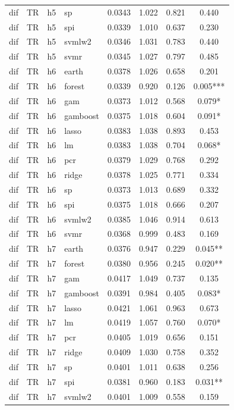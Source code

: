 \begin{ThreePartTable}
\begin{longtable}[t]{llclcccc}
dif & TR & h5 & sp & 0.0343 & 1.022 & 0.821 & 0.440\\
dif & TR & h5 & spi & 0.0339 & 1.010 & 0.637 & 0.230\\
dif & TR & h5 & svmlw2 & 0.0346 & 1.031 & 0.783 & 0.440\\
dif & TR & h5 & svmr & 0.0345 & 1.027 & 0.797 & 0.485\\
\addlinespace
dif & TR & h6 & earth & 0.0378 & 1.026 & 0.658 & 0.201\\
dif & TR & h6 & forest & 0.0339 & 0.920 & 0.126 & 0.005***\\
dif & TR & h6 & gam & 0.0373 & 1.012 & 0.568 & 0.079*\\
dif & TR & h6 & gamboost & 0.0375 & 1.018 & 0.604 & 0.091*\\
dif & TR & h6 & lasso & 0.0383 & 1.038 & 0.893 & 0.453\\
dif & TR & h6 & lm & 0.0383 & 1.038 & 0.704 & 0.068*\\
dif & TR & h6 & pcr & 0.0379 & 1.029 & 0.768 & 0.292\\
dif & TR & h6 & ridge & 0.0378 & 1.025 & 0.771 & 0.334\\
dif & TR & h6 & sp & 0.0373 & 1.013 & 0.689 & 0.332\\
dif & TR & h6 & spi & 0.0375 & 1.018 & 0.666 & 0.207\\
dif & TR & h6 & svmlw2 & 0.0385 & 1.046 & 0.914 & 0.613\\
dif & TR & h6 & svmr & 0.0368 & 0.999 & 0.483 & 0.169\\
\addlinespace
dif & TR & h7 & earth & 0.0376 & 0.947 & 0.229 & 0.045**\\
dif & TR & h7 & forest & 0.0380 & 0.956 & 0.245 & 0.020**\\
dif & TR & h7 & gam & 0.0417 & 1.049 & 0.737 & 0.135\\
dif & TR & h7 & gamboost & 0.0391 & 0.984 & 0.405 & 0.083*\\
dif & TR & h7 & lasso & 0.0421 & 1.061 & 0.963 & 0.673\\
dif & TR & h7 & lm & 0.0419 & 1.057 & 0.760 & 0.070*\\
dif & TR & h7 & pcr & 0.0405 & 1.019 & 0.656 & 0.151\\
dif & TR & h7 & ridge & 0.0409 & 1.030 & 0.758 & 0.352\\
dif & TR & h7 & sp & 0.0401 & 1.011 & 0.638 & 0.256\\
dif & TR & h7 & spi & 0.0381 & 0.960 & 0.183 & 0.031**\\
dif & TR & h7 & svmlw2 & 0.0401 & 1.009 & 0.558 & 0.159\\

\end{longtable}
\end{ThreePartTable}
